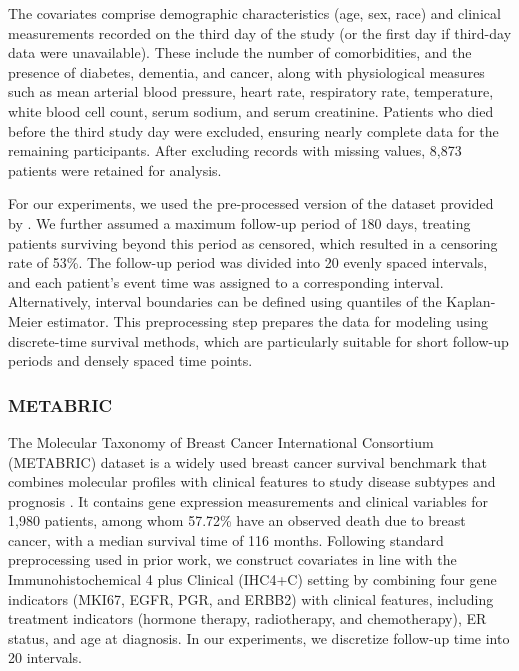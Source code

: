 \documentclass{article}
\theoremstyle{plain}
\theoremstyle{definition}
\theoremstyle{remark}
\begin{document}
The covariates comprise demographic characteristics (age, sex, race) and clinical measurements recorded on the third day of the study (or the first day if third-day data were unavailable). These include the number of comorbidities, and the presence of diabetes, dementia, and cancer, along with physiological measures such as mean arterial blood pressure, heart rate, respiratory rate, temperature, white blood cell count, serum sodium, and serum creatinine. Patients who died before the third study day were excluded, ensuring nearly complete data for the remaining participants. After excluding records with missing values, 8,873 patients were retained for analysis.

For our experiments, we used the pre-processed version of the dataset provided by \citep{katzman2018deepsurv}. 
We further assumed a maximum follow-up period of 180 days, treating patients surviving beyond this period as censored, which resulted in a censoring rate of 53\%. The follow-up period was divided into 20 evenly spaced intervals, and each patient's event time was assigned to a corresponding interval. Alternatively, interval boundaries can be defined using quantiles of the Kaplan-Meier estimator. This preprocessing step prepares the data for modeling using discrete-time survival methods, which are particularly suitable for short follow-up periods and densely spaced time points. 

\subsubsection{METABRIC}
The Molecular Taxonomy of Breast Cancer International Consortium (METABRIC) dataset is a widely used breast cancer survival benchmark that combines molecular profiles with clinical features to study disease subtypes and prognosis \citep{curtis2012genomic}.
It contains gene expression measurements and clinical variables for 1{,}980 patients, among whom 57.72\% have an observed death due to breast cancer, with a median survival time of 116 months.
Following standard preprocessing used in prior work, we construct covariates in line with the Immunohistochemical 4 plus Clinical (IHC4+C) setting by combining four gene indicators (MKI67, EGFR, PGR, and ERBB2) with clinical features, including treatment indicators (hormone therapy, radiotherapy, and chemotherapy), ER status, and age at diagnosis.
In our experiments, we discretize follow-up time into 20 intervals.
\end{document}
